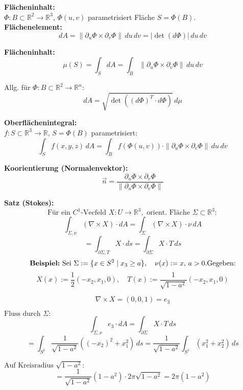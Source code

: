 \textbf{Flächeninhalt:} \\
$\Phi : B \subset \mathbb{R}^2 \to \mathbb{R}^3$, $\Phi(u,v)$ parametrisiert Fläche $S = \Phi(B)$. \\
\textbf{Flächenelement:}
\[
dA = \|\partial_u \Phi \times \partial_v \Phi\| \, du\,dv = |\det(d\Phi)| \, du\,dv
\]

\textbf{Flächeninhalt:}
\[
\mu(S) = \int_S dA = \int_B \|\partial_u \Phi \times \partial_v \Phi\| \, du\,dv
\]

Allg. für $\Phi: B \subset \mathbb{R}^2 \to \mathbb{R}^n$:
\[
dA = \sqrt{\det((d\Phi)^T \cdot d\Phi)} \, d\mu
\]

\vspace{1em}

\textbf{Oberflächenintegral:} \\
$f : S \subset \mathbb{R}^3 \to \mathbb{R}$, $S = \Phi(B)$ parametrisiert:
\[
\int_S f(x,y,z)\, dA = \int_B f(\Phi(u,v)) \cdot \|\partial_u \Phi \times \partial_v \Phi\| \, du\,dv
\]

\vspace{1em}

\textbf{Koorientierung (Normalenvektor):}
\[
\vec{n} = \frac{\partial_u \Phi \times \partial_v \Phi}{\|\partial_u \Phi \times \partial_v \Phi\|}
\]



\textbf{Satz (Stokes):} \\
\[
\text{Für ein } C^1\text{-Vecfeld } X : U \to \mathbb{R}^3, \text{ orient. Fläche } \Sigma \subset \mathbb{R}^3: 
\]
\[
\int_{\Sigma, \nu} (\nabla \times X) \cdot dA 
= \int_{\Sigma} (\nabla \times X) \cdot \nu \, dA 
\]
\[
= \int_{\partial \Sigma, T} X \cdot ds 
= \int_{\partial \Sigma} X \cdot T \, ds
\]
\[
\textbf{Beispiel:} \text{ Sei } \Sigma := \{x \in S^2 \mid x_3 \geq a \}, \quad \nu(x) := x, \, a > 0. \\
\text{Gegeben:}
\]
\[
X(x) := \frac{1}{2}(-x_2, x_1, 0), \quad T(x) := \frac{1}{\sqrt{1 - a^2}}(-x_2, x_1, 0)
\]

\[
\nabla \times X = (0, 0, 1) = e_3
\]

$\text{Fluss durch } \Sigma: $
\[
\int_{\Sigma, \nu} e_3 \cdot dA 
= \int_{\partial \Sigma} X \cdot T \, ds 
\]
\[
= \int_{S^1} \frac{1}{\sqrt{1-a^2}} ((-x_2)^2 + x_1^2) \, ds 
= \frac{1}{\sqrt{1 - a^2}} \int_{S^1} (x_1^2 + x_2^2) \, ds
\]

$\text{Auf Kreisradius } \sqrt{1 - a^2}: $
\[
= \frac{1}{\sqrt{1 - a^2}} (1 - a^2) \cdot 2\pi\sqrt{1 - a^2}
= 2\pi (1 - a^2)
\]


